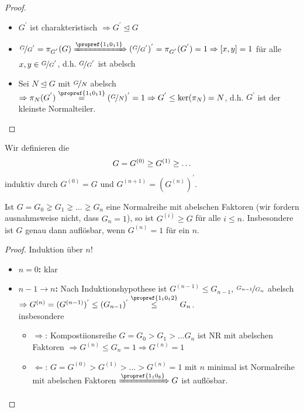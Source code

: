 \begin{proof}
	\begin{itemize}
		\item $G^{'}$ ist charakteristisch $\Rightarrow G^{'} \unlhd G$
		\item $\lnkset{G}{G^{'}} = \pi_{G^{'}} (G) \xRightarrow{\propref{1_10_11}} (\lnkset{G}{G^{'}})^{'} = \pi_{G^{'}}(G^{'}) = 1 \Rightarrow [x,y] = 1$ für alle $x,y \in \nicefrac{G}{G^{'}}$, d.h. $\nicefrac{G}{G^{'}}$ ist abelsch
		\item Sei $N \unlhd G$ mit $\nicefrac{G}{N}$ abelsch $\Rightarrow \pi_{N}(G^{'}) \overset{\propref{1_10_11}}{=} (\lnkset{G}{N})^{'} = 1 \Rightarrow G^{'} \leq \ker(\pi_{N}) = N$, d.h. $G^{'}$ ist der kleinste Normalteiler.
	\end{itemize}
\end{proof}

\begin{definition}[Kommutatorreihe]
	Wir definieren die 
	\begin{align}
	G = G^{(0)} \geq G^{(1)} \geq \dots\notag
	\end{align}
	induktiv durch $G^{(0)} = G$ und $G^{(n+1)} = (G^{(n)})^{'}$.
\end{definition}

\begin{proposition}
	Ist $G = G_0 \gneq G_1 \gneq \dots \gneq G_n$ eine Normalreihe mit abelschen Faktoren (wir fordern ausnahmsweise nicht, dass $G_n = 1$), so ist $G^{(i)} \geq G$ für alle $i \leq n$. Insbesondere ist $G$ genau dann auflösbar, wenn $G^{(n)} = 1$ für ein $n$.
\end{proposition}

\begin{proof}
	Induktion über $n$!
	\begin{itemize}
		\item \textbf{$n = 0$:} klar
		\item \textbf{$n-1 \to n$:} Nach Induktionshypothese ist $G^{(n-1)} \leq G_{n-1}$, $\nicefrac{G_{n-1}}{G_n}$ abelsch $\Rightarrow G^{(n)} = (G^{(n-1)})^{'} \leq (G_{n-1})^{'} \overset{\propref{1_10_12}}{\leq} G_n$.\\
		insbesondere
		\begin{itemize}
			\item $\Rightarrow$: Kompostiionsreihe $G = G_0 > G_1 > \dots G_n$ ist NR mit abelschen Faktoren $\Rightarrow G^{(n)} \leq G_n = 1 \Rightarrow G^{(n)} = 1$
			\item $\Leftarrow$: $G = G^{(0)} > G^{(1)} > \dots > G^{(n)} = 1$ mit $n$ minimal ist Normalreihe mit abelschen Faktoren $\xRightarrow{\propref{1_10_8}} G$ ist auflösbar.
		\end{itemize}
	\end{itemize}
\end{proof}

